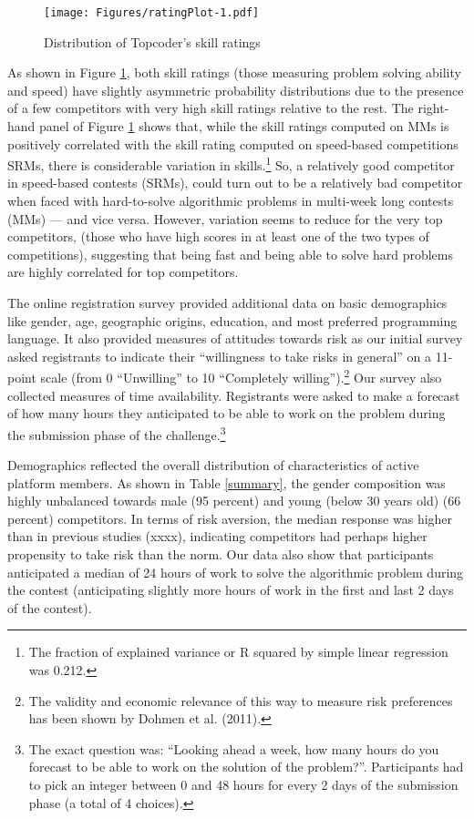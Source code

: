 \documentclass[10pt, titlepage]{article}
\begin{document}
\begin{figure}
\centering
\caption{Distribution of Topcoder's skill ratings}
\label{skill ratings}
\texttt{[image: Figures/ratingPlot-1.pdf]}
\end{figure}

As shown in Figure \ref{skill ratings}, both skill ratings (those
measuring problem solving ability and speed) have slightly asymmetric
probability distributions due to the presence of a few competitors with
very high skill ratings relative to the rest. The right-hand panel of
Figure \ref{skill ratings} shows that, while the skill ratings computed
on MMs is positively correlated with the skill rating computed on
speed-based competitions SRMs, there is considerable variation in
skills.\footnote{The fraction of explained variance or R squared by
  simple linear regression was 0.212.} So, a relatively good competitor
in speed-based contests (SRMs), could turn out to be a relatively bad
competitor when faced with hard-to-solve algorithmic problems in
multi-week long contests (MMs) --- and vice versa. However, variation
seems to reduce for the very top competitors, (those who have high
scores in at least one of the two types of competitions), suggesting
that being fast and being able to solve hard problems are highly
correlated for top competitors.

The online registration survey provided additional data on basic
demographics like gender, age, geographic origins, education, and most
preferred programming language. It also provided measures of attitudes
towards risk as our initial survey asked registrants to indicate their
``willingness to take risks in general'' on a 11-point scale (from 0
``Unwilling'' to 10 ``Completely willing'').\footnote{The validity and
  economic relevance of this way to measure risk preferences has been
  shown by Dohmen et al. (2011).} Our survey also collected measures of
time availability. Registrants were asked to make a forecast of how many
hours they anticipated to be able to work on the problem during the
submission phase of the challenge.\footnote{The exact question was:
  ``Looking ahead a week, how many hours do you forecast to be able to
  work on the solution of the problem?''. Participants had to pick an
  integer between 0 and 48 hours for every 2 days of the submission
  phase (a total of 4 choices).}

Demographics reflected the overall distribution of characteristics of
active platform members. As shown in Table \ref{summary}, the gender
composition was highly unbalanced towards male (95 percent) and young
(below 30 years old) (66 percent) competitors. In terms of risk
aversion, the median response was higher than in previous studies
(xxxx), indicating competitors had perhaps higher propensity to take
risk than the norm. Our data also show that participants anticipated a
median of 24 hours of work to solve the algorithmic problem during the
contest (anticipating slightly more hours of work in the first and last
2 days of the contest).
\end{document}
